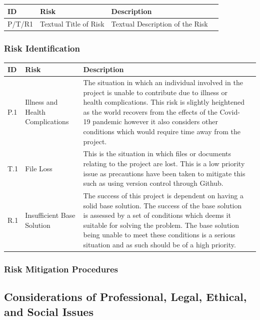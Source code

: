 \documentclass[11pt]{article}  %
\theoremstyle{definition}
\theoremstyle{remark}
\begin{document}
\begin{tabularx}{1.1\textwidth} {
	|  >{\center\arraybackslash}X
	| >{\center\arraybackslash}X
	| >{\center\arraybackslash}X
	| >{\center\arraybackslash} X | }
	\hline
	ID & Risk & Description \\
	\hline
	P/T/R1 & Textual Title of Risk & Textual Description of the Risk \\
	\hline
\end{tabularx}

\subsubsection {Risk Identification}

\begin{tabularx}{1.1\textwidth} {
	|  >{\center\arraybackslash}X
	| >{\center\arraybackslash}X
	| >{\center\arraybackslash}X
	| >{\center\arraybackslash} X | }
	\hline
	ID & Risk & Description \\
	\hline
	P.1 & Illness and Health Complications & The situation in which an individual involved in the project is unable to contribute due to illness or health complications. This risk is slightly heightened as the world recovers from the effects of the Covid-19 pandemic however it also considers other conditions which would require time away from the project. \\
	\hline
	T.1 & File Loss & This is the situation in which files or documents relating to the project are lost. This is a low priority issue as precautions have been taken to mitigate this such as using version control through Github. \\
	\hline
	R.1 & Insufficient Base Solution & The success of this project is dependent on having a solid base solution. The success of the base solution is assessed by a set of conditions which deems it suitable for solving the problem. The base solution being unable to meet these conditions is a serious situation and as such should be of a high priority. \\
	\hline
\end{tabularx}

\subsubsection {Risk Mitigation Procedures}

\subsection {Considerations of Professional, Legal, Ethical, and Social Issues}
\end{document}
